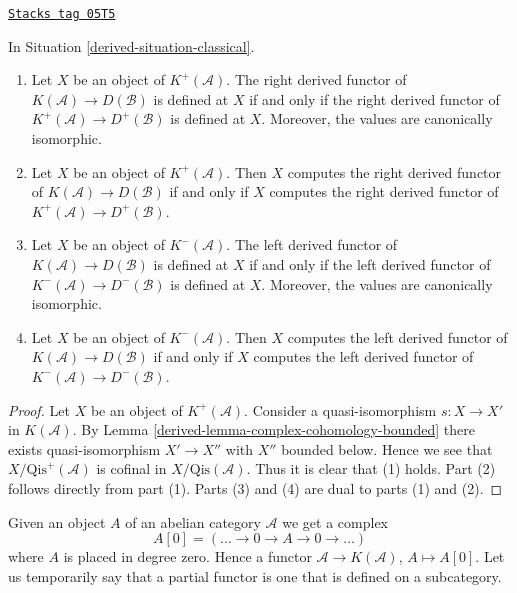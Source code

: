 \begin{lemma}[Irrelevant]
\label{derived-lemma-irrelevant}
\href{https://stacks.math.columbia.edu/tag/05T5}{\texttt{Stacks tag 05T5}}

In
Situation \ref{derived-situation-classical}.
\begin{enumerate}
\item Let $X$ be an object of $K^{+}(\mathcal{A})$.
The right derived functor of $K(\mathcal{A}) \to D(\mathcal{B})$
is defined at $X$ if and only if the right derived functor of
$K^{+}(\mathcal{A}) \to D^{+}(\mathcal{B})$ is defined at $X$.
Moreover, the values are canonically isomorphic.
\item Let $X$ be an object of $K^{+}(\mathcal{A})$.
Then $X$ computes the right derived functor of
$K(\mathcal{A}) \to D(\mathcal{B})$
if and only if $X$ computes the right derived functor of
$K^{+}(\mathcal{A}) \to D^{+}(\mathcal{B})$.
\item Let $X$ be an object of $K^{-}(\mathcal{A})$.
The left derived functor of $K(\mathcal{A}) \to D(\mathcal{B})$
is defined at $X$ if and only if the left derived functor of
$K^{-}(\mathcal{A}) \to D^{-}(\mathcal{B})$ is defined at $X$.
Moreover, the values are canonically isomorphic.
\item Let $X$ be an object of $K^{-}(\mathcal{A})$.
Then $X$ computes the left derived functor of
$K(\mathcal{A}) \to D(\mathcal{B})$ if and only if $X$ computes
the left derived functor of $K^{-}(\mathcal{A}) \to D^{-}(\mathcal{B})$.
\end{enumerate}
\end{lemma}

\begin{proof}

Let $X$ be an object of $K^{+}(\mathcal{A})$.
Consider a quasi-isomorphism $s : X \to X'$ in $K(\mathcal{A})$.
By
Lemma \ref{derived-lemma-complex-cohomology-bounded}
there exists quasi-isomorphism $X' \to X''$ with $X''$ bounded below.
Hence we see that $X/\text{Qis}^+(\mathcal{A})$ is cofinal
in $X/\text{Qis}(\mathcal{A})$. Thus it is clear that (1) holds.
Part (2) follows directly from part (1).
Parts (3) and (4) are dual to parts (1) and (2).
\end{proof}

Given an object $A$ of an abelian category $\mathcal{A}$ we get a complex
$$
A[0] = ( \ldots \to 0 \to A \to 0 \to \ldots )
$$
where $A$ is placed in degree zero. Hence a functor
$\mathcal{A} \to K(\mathcal{A})$, $A \mapsto A[0]$.
Let us temporarily say that a partial functor is one that is
defined on a subcategory.


